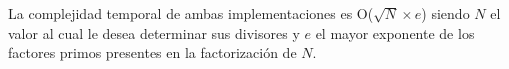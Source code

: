 La complejidad temporal de ambas implementaciones es O($\sqrt{N}\times e$) siendo $N$ el valor al cual le desea determinar sus divisores y $e$ el mayor exponente de los factores primos presentes en la factorización de $N$.